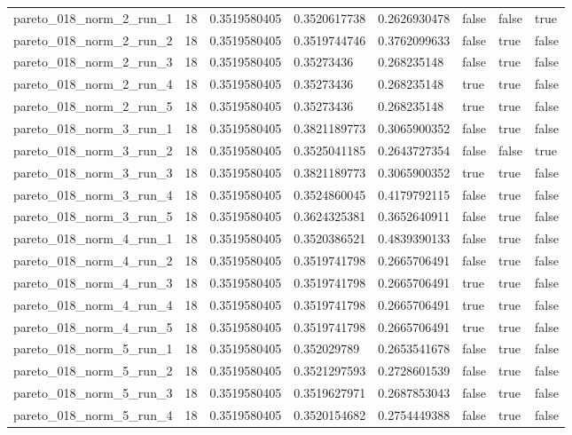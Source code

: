 \begin{tabular}{@{}llllllll@{}}
pareto\_018\_norm\_2\_run\_1 & 18 & 0.3519580405 & 0.3520617738 & 0.2626930478 & false & false & true \\
pareto\_018\_norm\_2\_run\_2 & 18 & 0.3519580405 & 0.3519744746 & 0.3762099633 & false & true & false \\
pareto\_018\_norm\_2\_run\_3 & 18 & 0.3519580405 & 0.35273436 & 0.268235148 & false & true & false \\
pareto\_018\_norm\_2\_run\_4 & 18 & 0.3519580405 & 0.35273436 & 0.268235148 & true & true & false \\
pareto\_018\_norm\_2\_run\_5 & 18 & 0.3519580405 & 0.35273436 & 0.268235148 & true & true & false \\
pareto\_018\_norm\_3\_run\_1 & 18 & 0.3519580405 & 0.3821189773 & 0.3065900352 & false & true & false \\
pareto\_018\_norm\_3\_run\_2 & 18 & 0.3519580405 & 0.3525041185 & 0.2643727354 & false & false & true \\
pareto\_018\_norm\_3\_run\_3 & 18 & 0.3519580405 & 0.3821189773 & 0.3065900352 & true & true & false \\
pareto\_018\_norm\_3\_run\_4 & 18 & 0.3519580405 & 0.3524860045 & 0.4179792115 & false & true & false \\
pareto\_018\_norm\_3\_run\_5 & 18 & 0.3519580405 & 0.3624325381 & 0.3652640911 & false & true & false \\
pareto\_018\_norm\_4\_run\_1 & 18 & 0.3519580405 & 0.3520386521 & 0.4839390133 & false & true & false \\
pareto\_018\_norm\_4\_run\_2 & 18 & 0.3519580405 & 0.3519741798 & 0.2665706491 & false & true & false \\
pareto\_018\_norm\_4\_run\_3 & 18 & 0.3519580405 & 0.3519741798 & 0.2665706491 & true & true & false \\
pareto\_018\_norm\_4\_run\_4 & 18 & 0.3519580405 & 0.3519741798 & 0.2665706491 & true & true & false \\
pareto\_018\_norm\_4\_run\_5 & 18 & 0.3519580405 & 0.3519741798 & 0.2665706491 & true & true & false \\
pareto\_018\_norm\_5\_run\_1 & 18 & 0.3519580405 & 0.352029789 & 0.2653541678 & false & true & false \\
pareto\_018\_norm\_5\_run\_2 & 18 & 0.3519580405 & 0.3521297593 & 0.2728601539 & false & true & false \\
pareto\_018\_norm\_5\_run\_3 & 18 & 0.3519580405 & 0.3519627971 & 0.2687853043 & false & true & false \\
pareto\_018\_norm\_5\_run\_4 & 18 & 0.3519580405 & 0.3520154682 & 0.2754449388 & false & true & false \\

\end{tabular}
